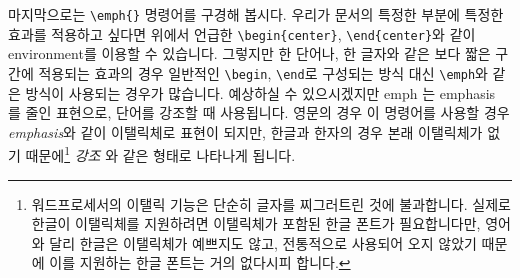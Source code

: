 마지막으로는 \verb|\emph{}| 명령어를 구경해 봅시다.
우리가 문서의 특정한 부분에 특정한 효과를 적용하고 싶다면 위에서 언급한 \verb|\begin{center}|, \verb|\end{center}|와 같이 environment를 이용할 수 있습니다.
그렇지만 한 단어나, 한 글자와 같은 보다 짧은 구간에 적용되는 효과의 경우 일반적인 \verb|\begin|, \verb|\end|로 구성되는 방식 대신 \verb|\emph|와 같은 방식이 사용되는 경우가 많습니다.
예상하실 수 있으시겠지만 emph 는 emphasis 를 줄인 표현으로, 단어를 강조할 때 사용됩니다. 영문의 경우 이 명령어를 사용할 경우 \emph{emphasis}와 같이 이탤릭체로 표현이 되지만, 한글과 한자의 경우 본래 이탤릭체가 없기 때문에\footnote{워드프로세서의 이탤릭 기능은 단순히 글자를 찌그러트린 것에 불과합니다. 실제로 한글이 이탤릭체를 지원하려면 이탤릭체가 포함된 한글 폰트가 필요합니다만, 영어와 달리 한글은 이탤릭체가 예쁘지도 않고, 전통적으로 사용되어 오지 않았기 때문에 이를 지원하는 한글 폰트는 거의 없다시피 합니다.} \emph{강조} 와 같은 형태로 나타나게 됩니다.

